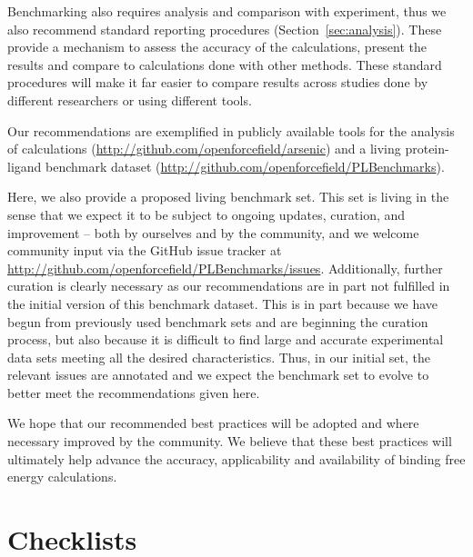 \documentclass[9pt,bestpractices]{livecoms}
\begin{document}
Benchmarking also requires analysis and comparison with experiment, thus we also recommend standard reporting procedures (Section~\ref{sec:analysis}). These provide a mechanism to assess the accuracy of the calculations, present the results and compare to calculations done with other methods. These standard procedures will make it far easier to compare results across studies done by different researchers or using different tools.

Our recommendations are exemplified in publicly available tools for the analysis of calculations (\url{http://github.com/openforcefield/arsenic})
and a living protein-ligand benchmark dataset (\url{http://github.com/openforcefield/PLBenchmarks}).
%

Here, we also provide a proposed living benchmark set. 
This set is living in the sense that we expect it to be subject to ongoing updates, curation, and improvement -- both by ourselves and by the community, and we welcome community input via the GitHub issue tracker at \url{http://github.com/openforcefield/PLBenchmarks/issues}. Additionally, further curation is clearly necessary as our recommendations are in part not fulfilled in the initial version of this benchmark dataset. This is in part because we have begun from previously used benchmark sets and are beginning the curation process, but also because it is difficult to find large and accurate experimental data sets meeting all the desired characteristics. Thus, in our initial set, the relevant issues are annotated and we expect the benchmark set to evolve to better meet the recommendations given here.

We hope that our recommended best practices will be adopted and where necessary improved by the community. We believe that these best practices will ultimately help advance the accuracy, applicability and availability of binding free energy calculations. 

\section{Checklists}
\label{sec:checklists}
\end{document}
